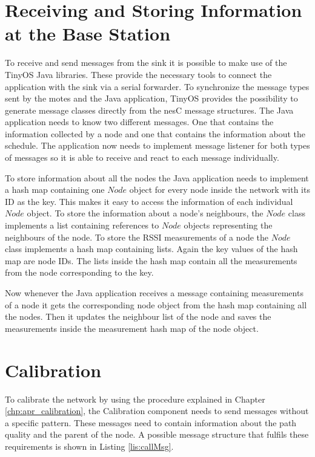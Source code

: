 
\section{Receiving and Storing Information at the Base Station}
\label{chp:imp_baseStation}
To receive and send messages from the sink it is possible to make use of the TinyOS Java libraries. These provide the necessary tools to connect the application with the sink via a serial forwarder. To synchronize the message types sent by the motes and the Java application, TinyOS provides the possibility to generate message classes directly from the nesC message structures. The Java application needs to know two different messages. One that contains the information collected by a node and one that contains the information about the schedule. The application now needs to implement message listener for both types of messages so it is able to receive and react to each message individually.

To store information about all the nodes the Java application needs to implement a hash map containing one $Node$ object for every node inside the network with its ID as the key. This makes it easy to access the information of each individual $Node$ object. To store the information about a node's neighbours, the $Node$ class implements a list containing references to $Node$ objects representing the neighbours of the node. To store the RSSI measurements of a node the $Node$ class implements a hash map containing lists. Again the key values of the hash map are node IDs. The lists inside the hash map contain all the measurements from the node corresponding to the key. 

Now whenever the Java application receives a message containing measurements of a node it gets the corresponding node object from the hash map containing all the nodes. Then it updates the neighbour list of the node and saves the measurements inside the measurement hash map of the node object.
\section{Calibration}
\label{chp:imp_calibration}
To calibrate the network by using the procedure explained in Chapter \ref{chp:apr_calibration}, the Calibration component needs to send messages without a specific pattern. These messages need to contain information about the path quality and the parent of the node. A possible message structure that fulfils these requirements is shown in Listing \ref{lis:callMsg}. 

